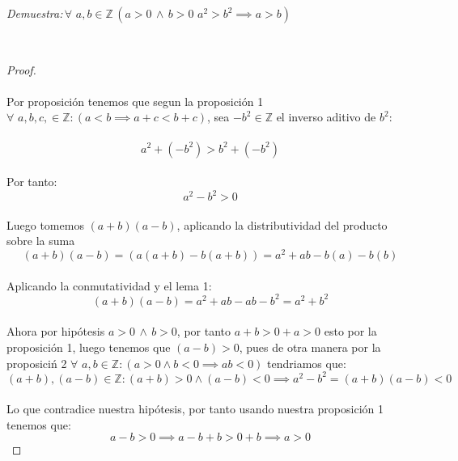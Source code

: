 \documentclass[11pt,letterpaper]{article}
\newcommand{\Z}{\mathbb{Z}}
\begin{document}
\begin{tcolorbox}[
	title = \textcolor{black}{\textcolor{white}{Problema 4}},]
\textit{Demuestra:\,$\forall\,\,a,b\in \Z\,(a>0\,\land\,b>0\,\,a^2>b^2 \implies a>b)$
}
\end{tcolorbox}\,\\
\begin{proof}\,\\
    \,\\
    Por proposici\'on tenemos que segun la proposici\'on 1 $\forall\,\,a,b,c,\in \Z:(a<b\implies a+c<b+c)$, sea $-b^2\in \Z$
    el inverso aditivo de $b^2$:\,\\
    \,\\
    \begin{equation*}
        a^2+(-b^2)>b^2+(-b^2)
    \end{equation*}\,\\
    Por tanto:\,\\
    \begin{equation*}
        a^2-b^2>0
    \end{equation*}\,\\
    Luego tomemos $(a+b)(a-b)$, aplicando la distributividad del producto sobre la suma\,\\
    \begin{equation*}
        (a+b)(a-b)=(a(a+b)-b(a+b))=a^2+ab-b(a)-b(b)
    \end{equation*}\,\\
    Aplicando la conmutatividad y el lema 1:\,\\
    \begin{equation*}
        (a+b)(a-b)=a^2+ab-ab-b^2=a^2+b^2
    \end{equation*}\,\\
    Ahora por hip\'otesis $a>0\,\land\,b>0$, por tanto $a+b>0+a>0$ esto por la proposici\'on 1, luego tenemos que
    $(a-b)>0$, pues de otra manera por la proposici\'n 2 $\forall\,\,a,b\in \Z:(a>0\land b<0\implies ab<0)$ tendriamos que:\,\\
    \begin{equation*}
        (a+b),(a-b)\in \Z: (a+b)>0 \land (a-b)<0 \implies a^2-b^2=(a+b)(a-b)<0
    \end{equation*}\,\\
    Lo que contradice nuestra hip\'otesis, por tanto usando nuestra proposici\'on 1 tenemos que:\,\\
    \begin{equation*}
        a-b>0\implies a-b+b>0+b \implies a>0
    \end{equation*}
\end{proof}\,\\
\end{document}
